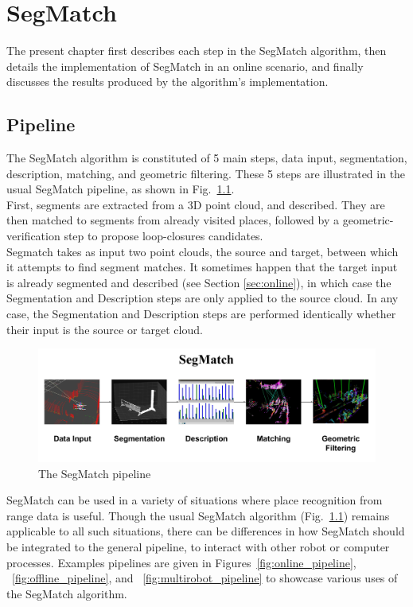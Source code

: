 \chapter{SegMatch}
\label{chap:segmatch}

The present chapter first describes each step in the SegMatch algorithm, then details the implementation of SegMatch in an online scenario, and finally discusses the results produced by the algorithm's implementation.

\section{Pipeline}
\label{sec:intro-pipeline}
The SegMatch algorithm is constituted of 5 main steps, data input, segmentation, description, matching, and geometric filtering. These 5 steps are illustrated in the usual SegMatch pipeline, as shown in Fig.~\ref{fig:pipeline}.\\

First, segments are extracted from a 3D point cloud, and described. They are then matched to segments from already visited places, followed by a geometric-verification step to propose loop-closures candidates.\\

Segmatch takes as input two point clouds, the source and target, between which it attempts to find segment matches.  
It sometimes happen that the target input is already segmented and described (see Section \ref{sec:online}), in which case the Segmentation and Description steps are only applied to the source cloud.  
In any case, the Segmentation and Description steps are performed identically whether their input is the source or target cloud.\\


\begin{figure}
  \centering
  \includegraphics[width=5.2in]{images/pipeline.pdf}
  \caption{The SegMatch pipeline}
  \label{fig:pipeline}
\end{figure}

SegMatch can be used in a variety of situations where place recognition from range data is useful. Though the usual SegMatch algorithm (Fig.~\ref{fig:pipeline}) remains applicable to all such situations, there can be differences in how SegMatch should be integrated to the general pipeline, to interact with other robot or computer processes. Examples pipelines are given in Figures~\ref{fig:online_pipeline}, ~\ref{fig:offline_pipeline}, and ~\ref{fig:multirobot_pipeline} to showcase various uses of the SegMatch algorithm.\\

